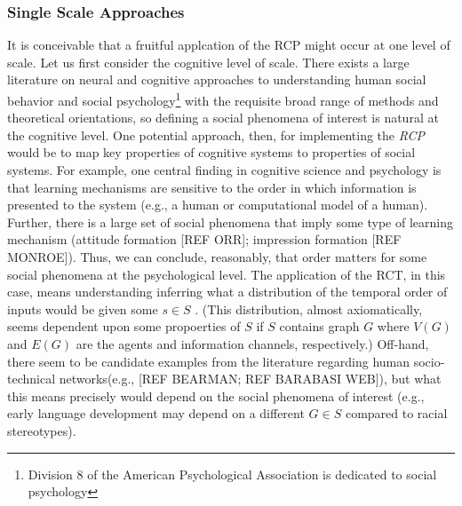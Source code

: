 \documentclass{article}
\begin{document}
\subsubsection{Single Scale Approaches}
It is conceivable that a fruitful applcation of the RCP might occur at one level of scale.  Let us first consider the cognitive level of scale.  There exists a large literature on neural and cognitive approaches to understanding human social behavior and social psychology\footnote{Division 8 of the American Psychological Association is dedicated to social psychology} with the requisite broad range of methods and theoretical orientations, so defining a social phenomena of interest is natural at the cognitive level. One potential approach, then, for implementing the \textit{RCP} would be to map key properties of cognitive systems to properties of social systems.  For example, one central finding in cognitive science and psychology is that learning mechanisms are sensitive to the order in which information is presented to the system (e.g., a human or computational model of a human).  Further, there is a large set of social phenomena that imply some type of learning mechanism (attitude formation [REF ORR]; impression formation [REF MONROE]).  Thus, we can conclude, reasonably, that order matters for some social phenomena at the psychological level.  The application of the RCT, in this case, means understanding inferring what a distribution of the temporal order of inputs would be given some $s \in S$ . (This distribution, almost axiomatically, seems dependent upon some propoerties of $S$ if $S$ contains graph $G$ where $V(G)$ and $E(G)$ are the agents and information channels, respectively.)  Off-hand, there seem to be candidate examples from the literature regarding human socio-technical networks(e.g., [REF BEARMAN; REF BARABASI WEB]), but what this means precisely would depend on the social phenomena of interest (e.g., early language development may depend on a different $G \in S$ compared to racial stereotypes).
\end{document}
